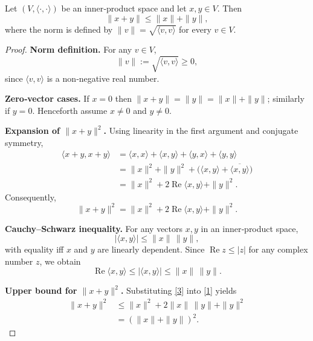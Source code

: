 \begin{theorem}
Let \((V,\langle\cdot,\cdot\rangle)\) be an inner‑product space and let \(x,y\in V\). Then
\[
\|x+y\|\le \|x\|+\|y\|,
\]
where the norm is defined by \(\|v\|=\sqrt{\langle v,v\rangle}\) for every \(v\in V\).
\end{theorem}

\begin{proof}
\textbf{Norm definition.}  
For any \(v\in V\),
\[
\|v\|:=\sqrt{\langle v,v\rangle}\ge 0,
\]
since \(\langle v,v\rangle\) is a non‑negative real number.

\medskip

\textbf{Zero‑vector cases.}  
If \(x=0\) then \(\|x+y\|=\|y\|=\|x\|+\|y\|\); similarly if \(y=0\).  
Henceforth assume \(x\neq0\) and \(y\neq0\).

\medskip

\textbf{Expansion of \(\|x+y\|^{2}\).}  
Using linearity in the first argument and conjugate symmetry,
\begin{align*}
\langle x+y,x+y\rangle
&=\langle x,x\rangle+\langle x,y\rangle+\langle y,x\rangle+\langle y,y\rangle\\
&=\|x\|^{2}+\|y\|^{2}+ \bigl(\langle x,y\rangle+\overline{\langle x,y\rangle}\bigr)\\
&=\|x\|^{2}+2\operatorname{Re}\langle x,y\rangle+\|y\|^{2}.
\end{align*}
Consequently,
\begin{equation}
\|x+y\|^{2}= \|x\|^{2}+2\operatorname{Re}\langle x,y\rangle+\|y\|^{2}.
\tag{1}
\end{equation}

\medskip

\textbf{Cauchy–Schwarz inequality.}  
For any vectors \(x,y\) in an inner‑product space,
\begin{equation}
|\langle x,y\rangle|\le \|x\|\,\|y\|,
\tag{2}
\end{equation}
with equality iff \(x\) and \(y\) are linearly dependent.  
Since \(\operatorname{Re}z\le|z|\) for any complex number \(z\), we obtain
\begin{equation}
\operatorname{Re}\langle x,y\rangle\le |\langle x,y\rangle|\le \|x\|\,\|y\|.
\tag{3}
\end{equation}

\medskip

\textbf{Upper bound for \(\|x+y\|^{2}\).}  
Substituting \eqref{3} into \eqref{1} yields
\begin{align}
\|x+y\|^{2}
&\le \|x\|^{2}+2\|x\|\,\|y\|+\|y\|^{2}\\
&=(\|x\|+\|y\|)^{2}.
\tag{4}
\end{align}


\end{proof}
